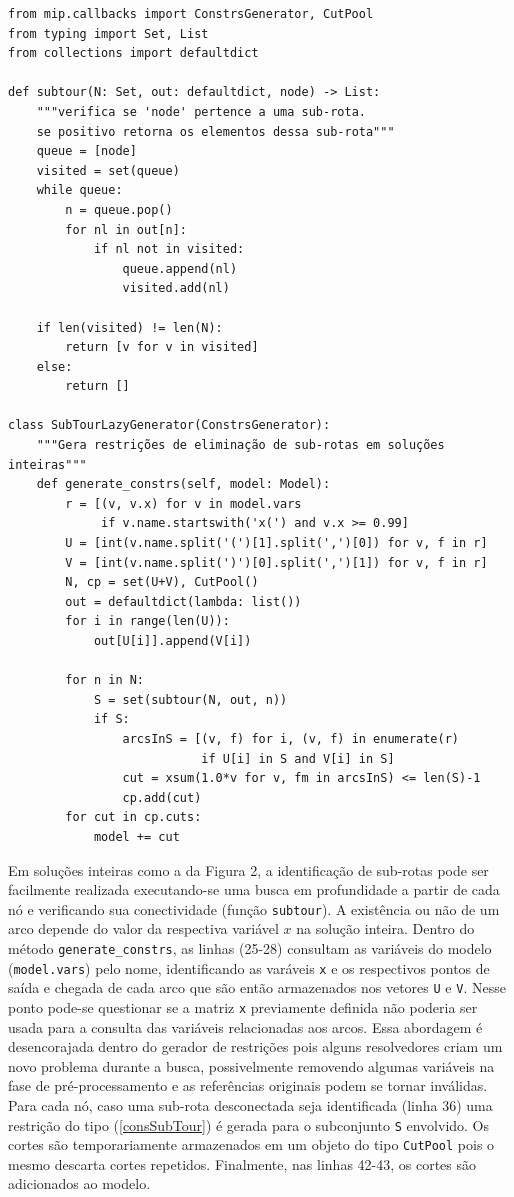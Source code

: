 \documentclass[a4paper,11pt,fleqn]{article}
\begin{document}
{\small
\begin{lstlisting}
from mip.callbacks import ConstrsGenerator, CutPool
from typing import Set, List
from collections import defaultdict

def subtour(N: Set, out: defaultdict, node) -> List:
    """verifica se 'node' pertence a uma sub-rota. 
    se positivo retorna os elementos dessa sub-rota"""
    queue = [node]
    visited = set(queue)
    while queue:
        n = queue.pop()
        for nl in out[n]:
            if nl not in visited:
                queue.append(nl)
                visited.add(nl)

    if len(visited) != len(N):
        return [v for v in visited]
    else:
        return []

class SubTourLazyGenerator(ConstrsGenerator):
    """Gera restrições de eliminação de sub-rotas em soluções inteiras"""
    def generate_constrs(self, model: Model):
        r = [(v, v.x) for v in model.vars
             if v.name.startswith('x(') and v.x >= 0.99]
        U = [int(v.name.split('(')[1].split(',')[0]) for v, f in r]
        V = [int(v.name.split(')')[0].split(',')[1]) for v, f in r]
        N, cp = set(U+V), CutPool()
        out = defaultdict(lambda: list())
        for i in range(len(U)):
            out[U[i]].append(V[i])

        for n in N:
            S = set(subtour(N, out, n))
            if S:
                arcsInS = [(v, f) for i, (v, f) in enumerate(r)
                           if U[i] in S and V[i] in S]
                cut = xsum(1.0*v for v, fm in arcsInS) <= len(S)-1
                cp.add(cut)
        for cut in cp.cuts:
            model += cut
\end{lstlisting}
}

Em soluções inteiras como a da Figura 2, a identificação de sub-rotas pode ser facilmente realizada executando-se uma busca em profundidade a partir de cada nó e verificando sua conectividade (função \texttt{subtour}). A existência ou não de um arco depende do valor da respectiva variável $x$ na solução inteira. Dentro do método \texttt{generate\_constrs}, as linhas (25-28) consultam as variáveis do modelo (\texttt{model.vars}) pelo nome, identificando as varáveis \texttt{x} e os respectivos pontos de saída e chegada de cada arco que são então armazenados nos vetores \texttt{U} e \texttt{V}. Nesse ponto pode-se questionar se a matriz \texttt{x} previamente definida não poderia ser usada para a consulta das variáveis relacionadas aos arcos. Essa abordagem é desencorajada dentro do gerador de restrições pois alguns resolvedores criam um novo problema durante a busca, possivelmente removendo algumas variáveis na fase de pré-processamento e as referências originais podem se tornar inválidas. Para cada nó, caso uma sub-rota desconectada seja identificada (linha 36) uma restrição do tipo (\ref{consSubTour}) é gerada para o subconjunto \texttt{S} envolvido. Os cortes são temporariamente armazenados em um objeto do tipo \texttt{CutPool} pois o mesmo descarta cortes repetidos. Finalmente, nas linhas 42-43, os cortes são adicionados ao modelo.
\end{document}
